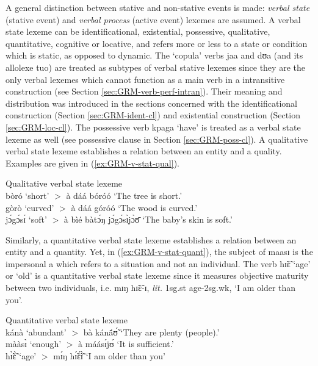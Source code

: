 \begin{exe}
\begin{exe}
\begin{exe}
\begin{exe}
\begin{exe}
\begin{exe}
\begin{exe}
\begin{exe}
\begin{exe}
\begin{exe}
\begin{exe}
A general distinction
between stative and non-stative events  is made: {\it verbal state} (stative
event) and {\it verbal process} (active event) 
lexemes are assumed. A verbal state lexeme can be identificational,
existential, possessive,  qualitative, quantitative, cognitive or  locative, and
refers more or less to a state or condition which is static, as opposed to
dynamic. The `copula' verbs {\sls jaa} and {\sls dʊa} (and its allolexe {\sls 
tuo})
are treated as subtypes of verbal stative lexemes since they are the only verbal
lexemes which cannot function as a main verb in  a  intransitive
construction (see Section \ref{sec:GRM-verb-perf-intran}). Their meaning and
distribution was introduced in the sections concerned with the identificational
construction (Section \ref{sec:GRM-ident-cl}) and existential construction
(Section \ref{sec:GRM-loc-cl}).  The possessive verb
{\sls kpaga} `have'  is treated as  a verbal state lexeme as well (see 
possessive
clause in Section   \ref{sec:GRM-poss-cl}).  A qualitative verbal state lexeme
establishes a relation between an entity and a quality. Examples are given in
(\ref{ex:GRM-v-stat-qual}).


\ea\label{ex:GRM-v-stat-qual}{\rm Qualitative verbal state lexeme}\\

 {\sls bòró}  {\rm `short'}  $>$ {\sls à dáá bóróó} {\rm  `The tree is short.'}\\
{\sls gòrò} {\rm `curved'}  $>$ {\sls à dáá góróó} {\rm  `The wood is curved.'}\\
{\sls jɔ́gɔ́sɪ́} {\rm `soft'}   $>$ {\sls   à bìé bàtɔ́ŋ jɔ́gɔ́sɪ̀jɔ̀ʊ̄} {\rm    `The 
baby's
skin is soft.'}
\z

Similarly, a quantitative verbal state lexeme  establishes a relation between an entity and a quantity. Yet, in (\ref{ex:GRM-v-stat-quant}), the subject of   {\sls maasɪ} is the impersonal  {\sls a} which refers to a situation and not an individual. The verb {\sls hɪ̃ɛ̃}  `age' or `old'  is a quantitative verbal state lexeme since it  measures  objective maturity between two individuals, i.e. {\sls mɪŋ hɪ̃ɛ̃-ɪ}, {\it lit.} {\sc 1sg.st} age-{\sc 2sg.wk}, `I am older than you'. 


\ea\label{ex:GRM-v-stat-quant}{\rm Quantitative verbal state lexeme}\\

 {\sls kánà} {\rm  `abundant'}  $>$ {\sls bà kánã́ʊ̃́} {\rm   `They are plenty 
(people).'} 
\\
{\sls mààsɪ̀} {\rm `enough'}  $>$   {\sls à máásɪ́jʊ́} {\rm    `It is sufficient.'}\\
{\sls hɪ̃̀ɛ̃̀} {\rm `age'} $>$ {\sls mɪ́ŋ hɪ̃́ɛ̃́ɪ̃̀} {\rm    `I am older than you'}
\z


\end{exe}
\end{exe}
\end{exe}
\end{exe}
\end{exe}
\end{exe}
\end{exe}
\end{exe}
\end{exe}
\end{exe}
\end{exe}
